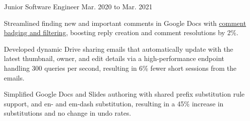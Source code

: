 \begin{cventry}
    {}
    {Junior Software Engineer}
    {Mar. 2020 to Mar. 2021}{}
    \begin{cvitems}
        \item Streamlined finding new and important comments in Google Docs with \href{https://workspaceupdates.googleblog.com/2021/02/improvements-for-locating-new-comments-important-conversations-google-docs.html}{comment badging and filtering}, boosting reply creation and comment resolutions by 2\%.
        \item Developed dynamic Drive sharing emails that automatically update with the latest thumbnail, owner, and edit details via a high-performance endpoint handling 300 queries per second, resulting in 6\% fewer short sessions from the emails.
        \item Simplified Google Docs and Slides authoring with shared prefix substitution rule support, and en- and em-dash substitution, resulting in a 45\% increase in substitutions and no change in undo rates.
    \end{cvitems}
\end{cventry}
